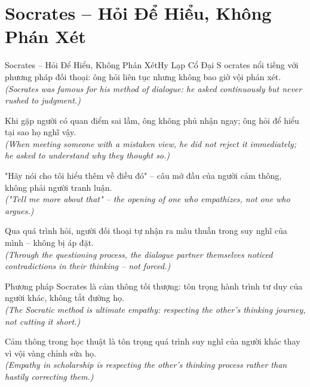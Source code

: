 \section{Socrates -- Hỏi Để Hiểu, Không Phán Xét}
\begin{truyen}{Socrates -- Hỏi Để Hiểu, Không Phán Xét}{Hy Lạp Cổ Đại}
S ocrates nổi tiếng với phương pháp đối thoại: ông hỏi liên tục nhưng không bao giờ vội phán xét.\\
\textit{(Socrates was famous for his method of dialogue: he asked continuously but never rushed to judgment.)}

Khi gặp người có quan điểm sai lầm, ông không phủ nhận ngay; ông hỏi để hiểu tại sao họ nghĩ vậy.\\
\textit{(When meeting someone with a mistaken view, he did not reject it immediately; he asked to understand why they thought so.)}

"Hãy nói cho tôi hiểu thêm về điều đó" -- câu mở đầu của người cảm thông, không phải người tranh luận.\\
\textit{("Tell me more about that" -- the opening of one who empathizes, not one who argues.)}

Qua quá trình hỏi, người đối thoại tự nhận ra mâu thuẫn trong suy nghĩ của mình -- không bị áp đặt.\\
\textit{(Through the questioning process, the dialogue partner themselves noticed contradictions in their thinking -- not forced.)}

Phương pháp Socrates là cảm thông tối thượng: tôn trọng hành trình tư duy của người khác, không tắt đường họ.\\
\textit{(The Socratic method is ultimate empathy: respecting the other's thinking journey, not cutting it short.)}

\end{truyen}
\begin{baihoc}
  Cảm thông trong học thuật là tôn trọng quá trình suy nghĩ của người khác thay vì vội vàng chỉnh sửa họ.\\
  \textit{(Empathy in scholarship is respecting the other's thinking process rather than hastily correcting them.)}
\end{baihoc}

